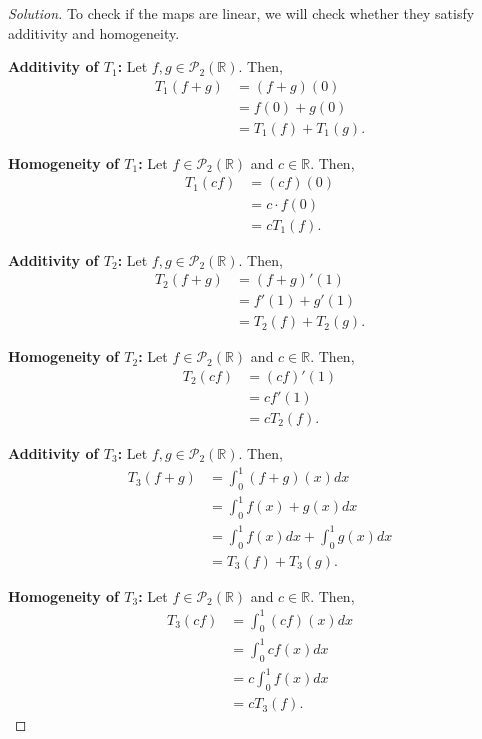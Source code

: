 \documentclass{article}
\begin{document}
\begin{proof}[Solution]
    To check if the maps are linear, we will check whether they satisfy additivity and homogeneity.

    \textbf{Additivity of $T_1$:} Let $f, g \in \mathcal{P}_2(\mathbb{R})$. Then,
    \begin{align*}
        T_1(f+g) & = (f+g)(0) \\
        & = f(0) + g(0) \\
        & = T_1(f) + T_1(g).
    \end{align*}

    \textbf{Homogeneity of $T_1$:} Let $f \in \mathcal{P}_2(\mathbb{R})$ and $c \in \mathbb{R}$. Then,
    \begin{align*}
        T_1(cf) & = (cf)(0) \\
        & = c\cdot f(0) \\
        & = cT_1(f).
    \end{align*}

    \textbf{Additivity of $T_2$:} Let $f, g \in \mathcal{P}_2(\mathbb{R})$. Then,
    \begin{align*}
        T_2(f+g) & = (f+g)'(1) \\
        & = f'(1) + g'(1) \\
        & = T_2(f) + T_2(g).
    \end{align*}

    \textbf{Homogeneity of $T_2$:} Let $f \in \mathcal{P}_2(\mathbb{R})$ and $c \in \mathbb{R}$. Then,
    \begin{align*}
        T_2(cf) & = (cf)'(1) \\
        & = cf'(1) \\
        & = cT_2(f).
    \end{align*}

    \textbf{Additivity of $T_3$:} Let $f, g \in \mathcal{P}_2(\mathbb{R})$. Then,
    \begin{align*}
        T_3(f+g) & = \int_{0}^1 (f+g)(x) dx \\
        & = \int_{0}^1 f(x) + g(x) dx \\
        & = \int_{0}^1 f(x) dx + \int_{0}^1 g(x) dx \\
        & = T_3(f) + T_3(g).
    \end{align*}

    \textbf{Homogeneity of $T_3$:} Let $f \in \mathcal{P}_2(\mathbb{R})$ and $c \in \mathbb{R}$. Then,
    \begin{align*}
        T_3(cf) & = \int_{0}^1 (cf)(x) dx \\
        & = \int_{0}^1 cf(x) dx \\
        & = c\int_{0}^1 f(x) dx \\
        & = cT_3(f).
    \end{align*}


\end{proof}
\end{document}
